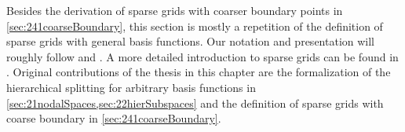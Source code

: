 Besides the derivation of sparse grids with
coarser boundary points in \cref{sec:241coarseBoundary},
this section is mostly
a repetition of the definition of sparse grids with general basis functions.
Our notation and presentation will roughly follow
\cite{Pflueger10Spatially} and \cite{Garcke13Sparse}.
A more detailed introduction to sparse grids can be found in
\cite{Bungartz04Sparse}.
Original contributions of the thesis in this chapter
are the formalization of the hierarchical splitting for
arbitrary basis functions in \cref{sec:21nodalSpaces,sec:22hierSubspaces} and
the definition of sparse grids with coarse boundary in
\cref{sec:241coarseBoundary}.








\cleardoublepage
